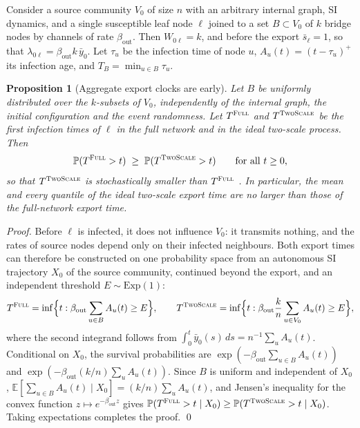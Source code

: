 \documentclass[a4paper,fleqn]{cas-sc}
\newtheorem{proposition}{Proposition}
\newcommand{\ibar}{\bar{y}}
\newcommand{\sbar}{\bar{s}}
\newcommand{\Exp}{\mathrm{Exp}}
\newcommand{\Full}{\textup{\textsc{Full}}}
\newcommand{\TS}{\textup{\textsc{TwoScale}}}
\begin{document}
Consider a source community $V_0$ of size $n$ with an arbitrary internal graph, SI dynamics, and a single susceptible leaf node $\ell$ joined to a set $B\subset V_0$ of $k$ bridge nodes by channels of rate $\beta_{\mathrm{out}}$. Then $W_{0\ell}=k$, and before the export $\sbar_\ell=1$, so that $\lambda_{0\ell}=\beta_{\mathrm{out}}k\,\ibar_0$. Let $\tau_u$ be the infection time of node $u$, $A_u(t)=(t-\tau_u)^+$ its infection age, and $T_B=\min_{u\in B}\tau_u$.

\begin{proposition}[Aggregate export clocks are early]
\label{prop:ordering}
Let $B$ be uniformly distributed over the $k$-subsets of $V_0$, independently of the internal graph, the initial configuration and the event randomness. Let $T^{\Full}$ and $T^{\TS}$ be the first infection times of $\ell$ in the full network and in the ideal two-scale process. Then
\[
\mathbb{P}(T^{\Full}>t)\;\ge\;\mathbb{P}(T^{\TS}>t)\qquad\text{for all }t\ge0,
\]
so that $T^{\TS}$ is stochastically smaller than $T^{\Full}$ \citep{shaked2007}. In particular, the mean and every quantile of the ideal two-scale export time are no larger than those of the full-network export time.
\end{proposition}

\begin{proof}
Before $\ell$ is infected, it does not influence $V_0$: it transmits nothing, and the rates of source nodes depend only on their infected neighbours. Both export times can therefore be constructed on one probability space from an autonomous SI trajectory $X_0$ of the source community, continued beyond the export, and an independent threshold $E\sim\Exp(1)$:
\[
T^{\Full}=\inf\Bigl\{t:\beta_{\mathrm{out}}\sum_{u\in B}A_u(t)\ge E\Bigr\},\qquad
T^{\TS}=\inf\Bigl\{t:\beta_{\mathrm{out}}\frac{k}{n}\sum_{u\in V_0}A_u(t)\ge E\Bigr\},
\]
where the second integrand follows from $\int_0^t\ibar_0(s)\,ds=n^{-1}\sum_uA_u(t)$. Conditional on $X_0$, the survival probabilities are $\exp(-\beta_{\mathrm{out}}\sum_{u\in B}A_u(t))$ and $\exp(-\beta_{\mathrm{out}}(k/n)\sum_uA_u(t))$. Since $B$ is uniform and independent of $X_0$, $\mathbb{E}[\sum_{u\in B}A_u(t)\mid X_0]=(k/n)\sum_uA_u(t)$, and Jensen's inequality for the convex function $z\mapsto e^{-\beta_{\mathrm{out}}z}$ gives $\mathbb{P}(T^{\Full}>t\mid X_0)\ge\mathbb{P}(T^{\TS}>t\mid X_0)$. Taking expectations completes the proof. \qed
\end{proof}
\end{document}
